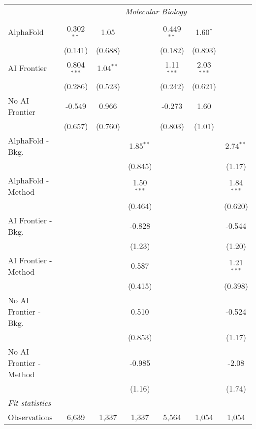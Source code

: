 \begin{tabular}{lcccccc}
 & \multicolumn{6}{c}{\textit{Molecular Biology}} \\ \\
   AlphaFold               & 0.302$^{**}$  & 1.05        &              & 0.449$^{**}$ & 1.60$^{*}$   &   \\   
                           & (0.141)       & (0.688)     &              & (0.182)      & (0.893)      &   \\   
   AI Frontier             & 0.804$^{***}$ & 1.04$^{**}$ &              & 1.11$^{***}$ & 2.03$^{***}$ &   \\   
                           & (0.286)       & (0.523)     &              & (0.242)      & (0.621)      &   \\   
   No AI Frontier          & -0.549        & 0.966       &              & -0.273       & 1.60         &   \\   
                           & (0.657)       & (0.760)     &              & (0.803)      & (1.01)       &   \\   
   AlphaFold - Bkg.        &               &             & 1.85$^{**}$  &              &              & 2.74$^{**}$\\   
                           &               &             & (0.845)      &              &              & (1.17)\\   
   AlphaFold - Method      &               &             & 1.50$^{***}$ &              &              & 1.84$^{***}$\\   
                           &               &             & (0.464)      &              &              & (0.620)\\   
   AI Frontier - Bkg.      &               &             & -0.828       &              &              & -0.544\\   
                           &               &             & (1.23)       &              &              & (1.20)\\   
   AI Frontier - Method    &               &             & 0.587        &              &              & 1.21$^{***}$\\   
                           &               &             & (0.415)      &              &              & (0.398)\\   
   No AI Frontier - Bkg.   &               &             & 0.510        &              &              & -0.524\\   
                           &               &             & (0.853)      &              &              & (1.17)\\   
   No AI Frontier - Method &               &             & -0.985       &              &              & -2.08\\   
                           &               &             & (1.16)       &              &              & (1.74)\\   
   \midrule
   \emph{Fit statistics}\\
   Observations            & 6,639         & 1,337       & 1,337        & 5,564        & 1,054        & 1,054\\  
   

\end{tabular}
